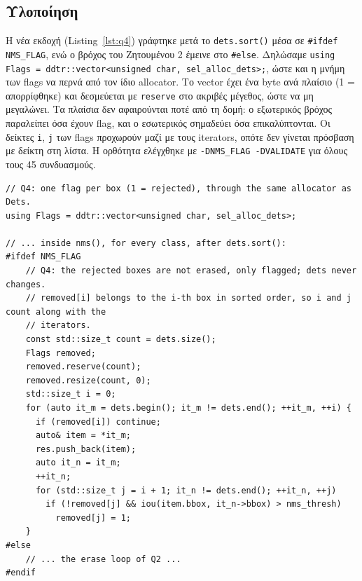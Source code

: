 \documentclass[11pt,a4paper]{article}
\newcommand{\en}[1]{\textlatin{#1}}
\begin{document}
\subsection{Υλοποίηση}
Η νέα εκδοχή (\en{Listing}~\ref{lst:q4}) γράφτηκε μετά το \en{\texttt{dets.sort()}} μέσα σε \en{\texttt{\#ifdef NMS\_FLAG}}, ενώ ο βρόχος του Ζητουμένου 2 έμεινε στο \en{\texttt{\#else}}. Δηλώσαμε \en{\texttt{using Flags = ddtr::vector<unsigned char, sel\_alloc\_dets>;}}, ώστε και η μνήμη των \en{flags} να περνά από τον ίδιο \en{allocator}. Το \en{vector} έχει ένα \en{byte} ανά πλαίσιο (1 = απορρίφθηκε) και δεσμεύεται με \en{\texttt{reserve}} στο ακριβές μέγεθος, ώστε να μη μεγαλώνει. Τα πλαίσια δεν αφαιρούνται ποτέ από τη δομή: ο εξωτερικός βρόχος παραλείπει όσα έχουν \en{flag}, και ο εσωτερικός σημαδεύει όσα επικαλύπτονται. Οι δείκτες \en{\texttt{i}}, \en{\texttt{j}} των \en{flags} προχωρούν μαζί με τους \en{iterators}, οπότε δεν γίνεται πρόσβαση με δείκτη στη λίστα. Η ορθότητα ελέγχθηκε με \en{\texttt{-DNMS\_FLAG -DVALIDATE}} για όλους τους 45 συνδυασμούς.

\begin{lstlisting}[caption={Η εκδοχή με flags (Ζητούμενο 4) στην \texttt{nms()}.}, label={lst:q4}]
// Q4: one flag per box (1 = rejected), through the same allocator as Dets.
using Flags = ddtr::vector<unsigned char, sel_alloc_dets>;

// ... inside nms(), for every class, after dets.sort():
#ifdef NMS_FLAG
    // Q4: the rejected boxes are not erased, only flagged; dets never changes.
    // removed[i] belongs to the i-th box in sorted order, so i and j count along with the
    // iterators.
    const std::size_t count = dets.size();
    Flags removed;
    removed.reserve(count);
    removed.resize(count, 0);
    std::size_t i = 0;
    for (auto it_m = dets.begin(); it_m != dets.end(); ++it_m, ++i) {
      if (removed[i]) continue;
      auto& item = *it_m;
      res.push_back(item);
      auto it_n = it_m;
      ++it_n;
      for (std::size_t j = i + 1; it_n != dets.end(); ++it_n, ++j)
        if (!removed[j] && iou(item.bbox, it_n->bbox) > nms_thresh)
          removed[j] = 1;
    }
#else
    // ... the erase loop of Q2 ...
#endif
\end{lstlisting}
\end{document}
